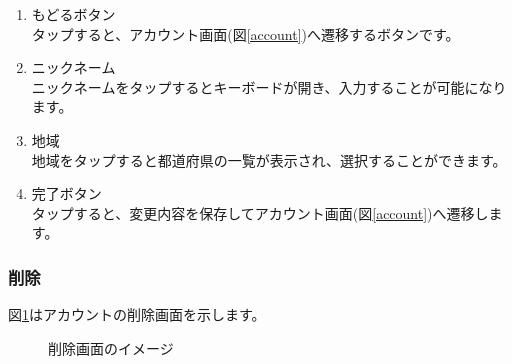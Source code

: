 \documentclass[a4j]{jarticle}
\begin{document}
\begin{enumerate}
  \renewcommand{\labelenumi}{\textcircled{\scriptsize \theenumi}}
\item もどるボタン\\
  タップすると、アカウント画面(図\ref{account})へ遷移するボタンです。
\item ニックネーム\\
  ニックネームをタップするとキーボードが開き、入力することが可能になります。
\item 地域\\
  地域をタップすると都道府県の一覧が表示され、選択することができます。
\item 完了ボタン\\
  タップすると、変更内容を保存してアカウント画面(図\ref{account})へ遷移します。
\end{enumerate}


\newpage
\subsubsection{削除}
図\ref{delete}はアカウントの削除画面を示します。\\

\begin{figure}[H]
    \begin{center}
    \caption {削除画面のイメージ}
    \label{delete}
    \end{center}
\end{figure}
\end{document}
